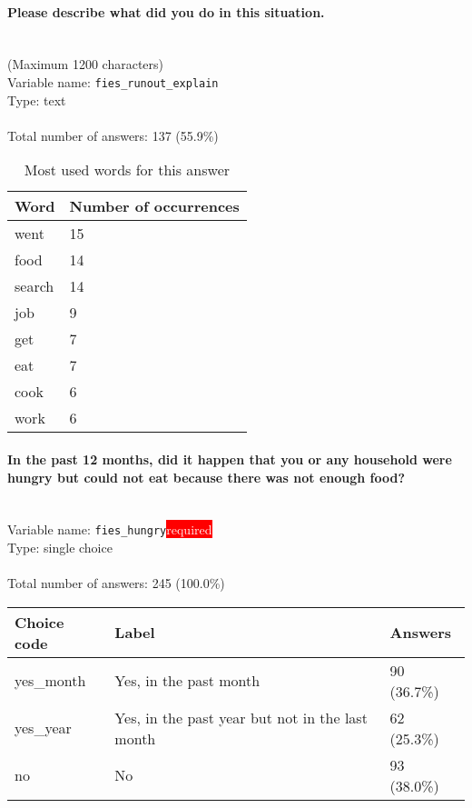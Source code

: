 \documentclass[11.5pt, a4paper]{scrartcl}
\begin{document}
\paragraph{Please describe what did you do in this situation.}
\ \\ {\small (Maximum 1200 characters)}
\  \\Variable name: \texttt{fies\_runout\_explain}\\
Type: text\\
\\Total number of answers: 137 (55.9\%)
\\[0.2em]\begin{table}[H]
 \begin{tabular}{p{4cm}|p{8cm}}
Word & Number of occurrences  \\
\hline
\cellcolor{mygray}went&\cellcolor{mygray}15\\
\hline
food&14\\
\hline
\cellcolor{mygray}search&\cellcolor{mygray}14\\
\hline
job&9\\
\hline
\cellcolor{mygray}get&\cellcolor{mygray}7\\
\hline
eat&7\\
\hline
\cellcolor{mygray}cook&\cellcolor{mygray}6\\
\hline
work&6\\
\hline
\end{tabular}
\caption{\label{tab:table-name} Most used words for this answer}
\end{table}
\paragraph{In the past 12 months, did it happen that you or any household were hungry but could not eat because there was not enough food? }
\  \\Variable name: \texttt{fies\_hungry}\hfill\colorbox{red}{\small{\textcolor{white}{required}}}\\
 Type: single choice\\
\\Total number of answers: 245 (100.0\%)
\\[0.2em] \begin{tabular}{p{4cm}|p{8cm}|p{3cm}}
Choice code & Label & Answers \\
\hline
yes\_month & Yes, in the past month& \cellcolor{color1}90 (36.7\%)\\
\cellcolor{mygray} yes\_year & \cellcolor{mygray}Yes, in the past year but not in the last month & \cellcolor{color1}62 (25.3\%)\\
no & No& \cellcolor{color1}93 (38.0\%)\\
\end{tabular}
\end{document}
